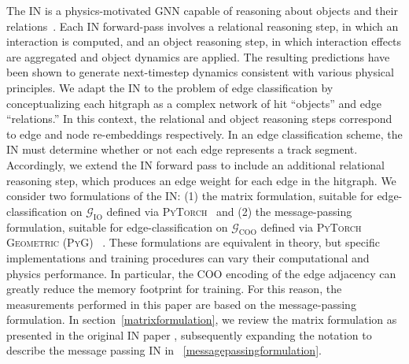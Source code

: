 \documentclass[twocolumn]{svjour3}
\begin{document}
The IN is a physics-motivated GNN capable of reasoning about objects and their relations~\cite{IN}. 
Each IN forward-pass involves a relational reasoning step, in which an interaction is computed, and an object reasoning step, in which interaction effects are aggregated and object dynamics are applied. 
The resulting predictions have been shown to generate next-timestep dynamics consistent with various physical principles. 
We adapt the IN to the problem of edge classification by conceptualizing each hitgraph as a complex network of hit ``objects'' and edge ``relations.''
In this context, the relational and object reasoning steps correspond to edge and node re-embeddings respectively. 
In an edge classification scheme, the IN must determine whether or not each edge represents a track segment. 
Accordingly, we extend the IN forward pass to include an additional relational reasoning step, which produces an edge weight for each edge in the hitgraph. 
We consider two formulations of the IN: (1) the matrix formulation, suitable for edge-classification on $\mathcal{G}_\mathrm{IO}$ defined via \textsc{PyTorch}~\cite{pytorch} and (2) the message-passing formulation, suitable for edge-classification on $\mathcal{G}_\mathrm{COO}$ defined via \textsc{PyTorch Geometric} (\textsc{PyG}) ~\cite{fey2019fast}. 
These formulations are equivalent in theory, but specific implementations and training procedures can vary their computational and physics performance. 
In particular, the COO encoding of the edge adjacency can greatly reduce the memory footprint for training. 
For this reason, the measurements performed in this paper are based on the message-passing formulation. 
In section~\ref{matrixformulation}, we review the matrix formulation as presented in the original IN paper \cite{IN}, subsequently expanding the notation to describe the message passing IN in ~\ref{messagepassingformulation}. 
\end{document}
